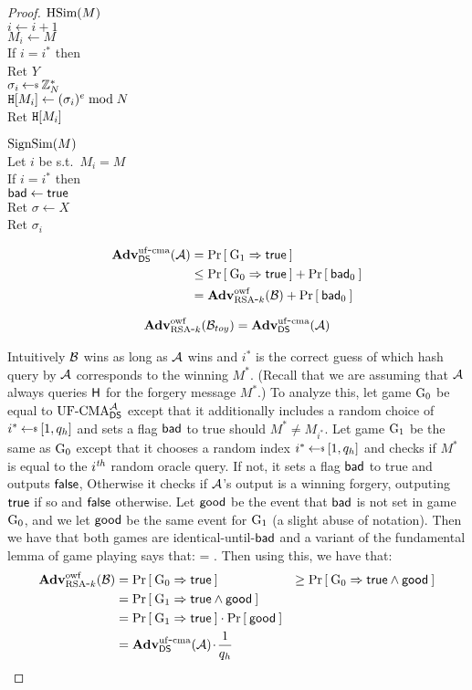 \begin{proof}
{\underline{$\textnormal{HSim}(M)$}\\
$i \gets i+1$\\
$M_i \gets M$\\
If $i = i^*$ then\\
\myInd Ret $Y$\\
$\sigma_i \getsr \Z_N^*$\\
$\mathtt{H}[M_i] \gets (\sigma_i)^e \bmod N$\\
Ret $\mathtt{H}[M_i]$\medskip

\underline{$\textnormal{SignSim}(M)$}\\
Let $i$ be s.t.~$M_i = M$\\
If $i = i^*$ then\\
\myInd $\mathsf{bad}\gets\mathsf{true}$\\
\myInd Ret $\sigma \gets X$\\
Ret $\sigma_i$
}


\begin{align*}
  \mathbf{Adv}^{\mathrm{uf\mbox{-} cma}}_{{\mathsf{DS}}}({\mathcal A}) &= \Pr\left[\: {{\textnormal G}}_1\Rightarrow\mathsf{true} \:\right]\\
      &\le \Pr\left[\: {{\textnormal G}}_0\Rightarrow\mathsf{true} \:\right] + \Pr\left[\: \mathsf{bad}_0 \:\right]\\
      &= \mathbf{Adv}^{\mathrm{owf}}_{{\textnormal{RSA}\mbox{-} k}}({\mathcal B}) + \Pr\left[\: \mathsf{bad}_0 \:\right]
\end{align*}

\begin{align*}
\mathbf{Adv}^{\mathrm{owf}}_{{\textnormal{RSA}\mbox{-} k}}({\mathcal B}_{toy}) = \mathbf{Adv}^{\mathrm{uf\mbox{-} cma}}_{{\mathsf{DS}}}({\mathcal A})
\end{align*}

Intuitively ${\mathcal B}$ wins as long as ${\mathcal A}$ wins and $i^*$ is the correct guess
of which hash query by ${\mathcal A}$ corresponds to the winning $M^*$. (Recall that we
are assuming that ${\mathcal A}$ always queries $\mathsf{H}$ for the forgery message
$M^*$.) To analyze this, let game ${{\textnormal G}}_0$ be equal to $\textnormal{UF-CMA}_{{\mathsf{DS}}}^{\mathcal A}$ except
that it additionally includes a random choice of $i^* \getsr [1,q_h]$ and sets a
flag $\mathsf{bad}$ to true should $M^* \ne M_{i^*}$. Let
game ${{\textnormal G}}_1$ be the same as ${{\textnormal G}}_0$ except that  it chooses a random index $i^*
\getsr [1,q_h]$ and checks if $M^*$ is equal to the $i^{\textit{th}}$ random oracle
query. If not, it sets a flag $\mathsf{bad}$ to true and outputs $\mathsf{false}$, 
Otherwise it checks if ${\mathcal A}$'s output is a winning forgery, outputing
$\mathsf{true}$ if so and $\mathsf{false}$ otherwise. Let $\mathsf{good}$ be the event that $\mathsf{bad}$ is
not set in game ${{\textnormal G}}_0$, and we let $\mathsf{good}$ be the same event for ${{\textnormal G}}_1$ (a
slight abuse of notation). Then we have that both games are
identical-until-$\mathsf{bad}$ and a variant of the fundamental lemma of game playing
says that:
\bnm
  \Prob{\G_0 \Rightarrow\true \land\good} = \Prob{\G_1\Rightarrow\true \land
  \good} \;.
\enm
Then using this, we have that:
\begin{align*}
\mathbf{Adv}^{\mathrm{owf}}_{{\textnormal{RSA}\mbox{-} k}}({\mathcal B}) 
  &= \Pr\left[\: {{\textnormal G}}_0\Rightarrow\mathsf{true} \:\right]
  &\ge \Pr\left[\: {{\textnormal G}}_0\Rightarrow\mathsf{true}\land\mathsf{good} \:\right]\\
  &= \Pr\left[\: {{\textnormal G}}_1\Rightarrow\mathsf{true}\land\mathsf{good} \:\right]\\
  &= \Pr\left[\: {{\textnormal G}}_1\Rightarrow\mathsf{true} \:\right]\cdot\Pr\left[\: \mathsf{good} \:\right]\\
  &= \mathbf{Adv}^{\mathrm{uf\mbox{-} cma}}_{{\mathsf{DS}}}({\mathcal A}){\hspace{-0.1ex}}{\hspace{-0.1ex}}{\hspace{-0.1ex}}\cdot{\hspace{-0.1ex}}{\hspace{-0.1ex}}{\hspace{-0.1ex}}\frac{1}{q_h}
\end{align*}

\end{proof}



